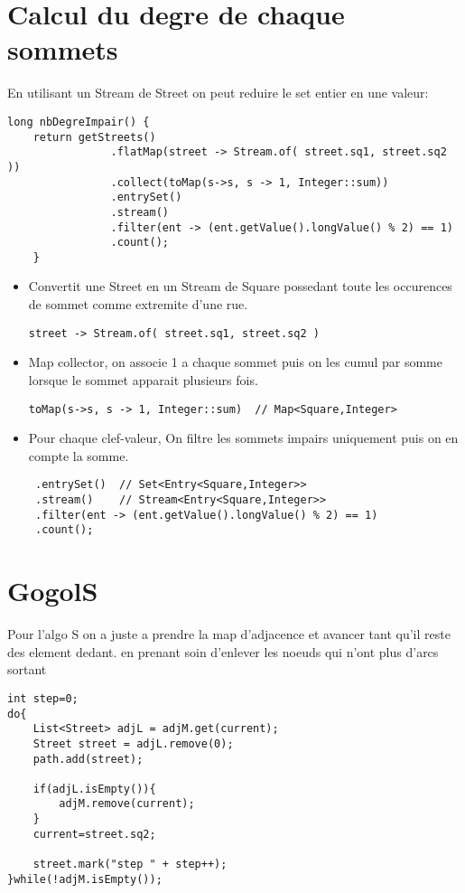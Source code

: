 \documentclass[a4paper, 11pt]{article}
\begin{document}
\section{Calcul du degre de chaque sommets}
En utilisant un Stream de Street on peut reduire le set entier en une
  valeur:
\begin{verbatim}
long nbDegreImpair() {	
    return getStreets()
                .flatMap(street -> Stream.of( street.sq1, street.sq2 ))
                .collect(toMap(s->s, s -> 1, Integer::sum))
                .entrySet()
                .stream()
                .filter(ent -> (ent.getValue().longValue() % 2) == 1)
                .count();
    }
\end{verbatim}
\begin{itemize}
  \item Convertit une Street en un Stream de Square possedant toute les occurences de
sommet comme extremite d'une rue.
\begin{verbatim}
street -> Stream.of( street.sq1, street.sq2 )
\end{verbatim} 
  \item Map collector, on associe 1 a chaque sommet puis on les cumul par somme lorsque
le sommet apparait plusieurs fois.
\begin{verbatim}
toMap(s->s, s -> 1, Integer::sum)  // Map<Square,Integer>
\end{verbatim}
  \item Pour chaque clef-valeur, On filtre les sommets impairs uniquement puis on
en compte la somme.
\begin{verbatim}
 .entrySet()  // Set<Entry<Square,Integer>>
 .stream()    // Stream<Entry<Square,Integer>>
 .filter(ent -> (ent.getValue().longValue() % 2) == 1) 
 .count();
\end{verbatim}
\end{itemize}



\section*{GogolS}
Pour l'algo S on a juste a prendre la map d'adjacence et avancer tant qu'il
reste des element dedant. en prenant soin d'enlever les noeuds qui n'ont plus
d'arcs sortant
\begin{verbatim}
int step=0;
do{
    List<Street> adjL = adjM.get(current);
    Street street = adjL.remove(0);
    path.add(street);
			
    if(adjL.isEmpty()){
        adjM.remove(current);
    }
    current=street.sq2;
			
    street.mark("step " + step++);
}while(!adjM.isEmpty());
\end{verbatim}
\end{document}
